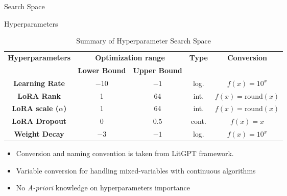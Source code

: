 \begin{frame}{Search Space}


    \begin{block}{Hyperparameters}
    
        \begin{table}[h!]
            \centering
            \begin{tabular}{|c|c|c|c|c|}
                \hline
                \multirow{2}{*}{\textbf{ Hyperparameters }} & \multicolumn{2}{|c|}{\textbf{Optimization range}} &\multirow{2}{*}{\textbf{ Type }}& \multirow{2}{*}{\textbf{ Conversion }} \\
                \cline{2-3}
                 & \textbf{ Lower Bound } & \textbf{ Upper Bound } & & \\
                \hline
                \textbf{Learning Rate} & $-10$ & $-1$ & log. & $f(x) = 10^{x}$ \\
                \hline
                \textbf{LoRA Rank} & 1 & 64 &int. &$f(x) = \text{round}(x)$ \\
                \hline
                \textbf{LoRA scale ($\alpha$)} &1 & 64 & int. &$f(x) = \text{round}(x)$ \\
                \hline
                \textbf{LoRA Dropout} & 0 & 0.5 & cont.& $f(x) = x$ \\
                \hline
                \textbf{Weight Decay} & $-3$ & $-1$ &log.& $f(x) = 10^{x}$  \\
                \hline
            \end{tabular}
            \caption{Summary of Hyperparameter Search Space}
            \label{tab:hyperparam_table}
        \end{table}
        
    \end{block}
    
    
    \begin{itemize}
        \item Conversion and naming convention is taken from LitGPT framework.
        \item Variable conversion for handling mixed-variables with continuous algorithms
        \item No \textit{A-priori} knowledge on hyperparameters importance
    \end{itemize}
\end{frame}


